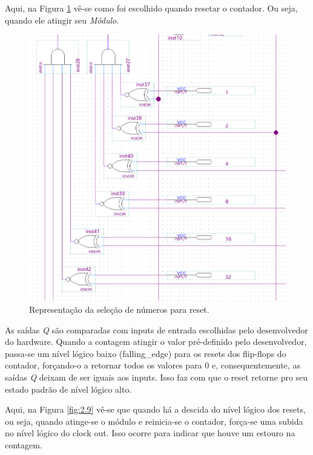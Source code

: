 Aqui, na Figura \ref{fig:2.8} vê-se como foi escolhido quando resetar o contador. Ou seja, quando ele atingir seu \emph{Módulo}.

\begin{figure}[H]
	\centering
	\includegraphics[width=1\columnwidth]{FIGURAS/cap_2/contador_8bits_reset.png}
	\caption{Representação da seleção de números para reset.}
        \label{fig:2.8}
\end{figure}



As saídas \emph{Q} são comparadas com inputs de entrada escolhidas pelo desenvolvedor do hardware. Quando a contagem atingir o valor pré-definido pelo desenvolvedor, passa-se um nível lógico baixo (falling\_edge) para os resets dos flip-flops do contador, forçando-o a retornar todos os valores para 0 e, consequentemente, as saídas \emph{Q} deixam de ser iguais aos inputs. Isso faz com que o reset retorne pro seu estado padrão de nível lógico alto.

Aqui, na Figura \ref{fig:2.9} vê-se que quando há a descida do nível lógico dos resets, ou seja, quando atinge-se o módulo e reinicia-se o contador, força-se uma subida no nível lógico do clock out. Isso ocorre  para indicar que houve um estouro na contagem.


